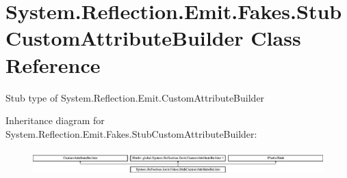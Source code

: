 \hypertarget{class_system_1_1_reflection_1_1_emit_1_1_fakes_1_1_stub_custom_attribute_builder}{\section{System.\-Reflection.\-Emit.\-Fakes.\-Stub\-Custom\-Attribute\-Builder Class Reference}
\label{class_system_1_1_reflection_1_1_emit_1_1_fakes_1_1_stub_custom_attribute_builder}
}


Stub type of System.\-Reflection.\-Emit.\-Custom\-Attribute\-Builder 


Inheritance diagram for System.\-Reflection.\-Emit.\-Fakes.\-Stub\-Custom\-Attribute\-Builder\-:\begin{figure}[H]
\begin{center}
\leavevmode
\includegraphics[height=1.011743cm]{class_system_1_1_reflection_1_1_emit_1_1_fakes_1_1_stub_custom_attribute_builder}
\end{center}
\end{figure}
